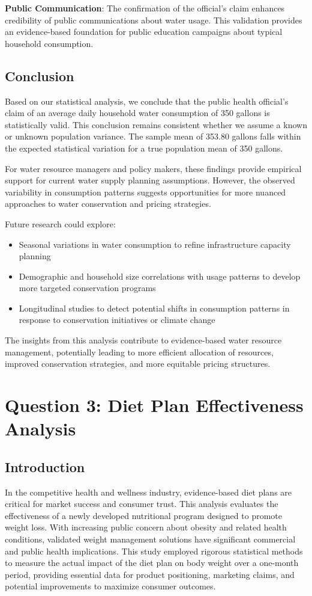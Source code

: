 \documentclass[12pt]{article}
\begin{document}
\textbf{Public Communication}: The confirmation of the official's claim enhances credibility of public communications about water usage. This validation provides an evidence-based foundation for public education campaigns about typical household consumption.

\subsection{Conclusion}
Based on our statistical analysis, we conclude that the public health official's claim of an average daily household water consumption of 350 gallons is statistically valid. This conclusion remains consistent whether we assume a known or unknown population variance. The sample mean of 353.80 gallons falls within the expected statistical variation for a true population mean of 350 gallons.

For water resource managers and policy makers, these findings provide empirical support for current water supply planning assumptions. However, the observed variability in consumption patterns suggests opportunities for more nuanced approaches to water conservation and pricing strategies.

Future research could explore:
\begin{itemize}
    \item Seasonal variations in water consumption to refine infrastructure capacity planning
    \item Demographic and household size correlations with usage patterns to develop more targeted conservation programs
    \item Longitudinal studies to detect potential shifts in consumption patterns in response to conservation initiatives or climate change
\end{itemize}

The insights from this analysis contribute to evidence-based water resource management, potentially leading to more efficient allocation of resources, improved conservation strategies, and more equitable pricing structures.
\newpage
\section{Question 3: Diet Plan Effectiveness Analysis}

\subsection{Introduction}
In the competitive health and wellness industry, evidence-based diet plans are critical for market success and consumer trust. This analysis evaluates the effectiveness of a newly developed nutritional program designed to promote weight loss. With increasing public concern about obesity and related health conditions, validated weight management solutions have significant commercial and public health implications. This study employed rigorous statistical methods to measure the actual impact of the diet plan on body weight over a one-month period, providing essential data for product positioning, marketing claims, and potential improvements to maximize consumer outcomes.
\end{document}
